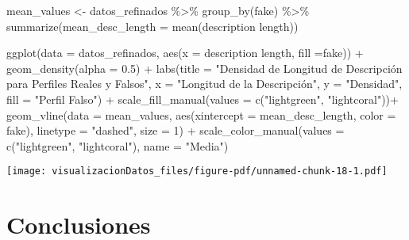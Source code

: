 \documentclass[
  letterpaper,
  DIV=11,
  numbers=noendperiod]{scrreprt}
\newenvironment{Shaded}{\begin{snugshade}}{\end{snugshade}}
\newcommand{\AttributeTok}[1]{\textcolor[rgb]{0.40,0.45,0.13}{#1}}
\newcommand{\DecValTok}[1]{\textcolor[rgb]{0.68,0.00,0.00}{#1}}
\newcommand{\FloatTok}[1]{\textcolor[rgb]{0.68,0.00,0.00}{#1}}
\newcommand{\FunctionTok}[1]{\textcolor[rgb]{0.28,0.35,0.67}{#1}}
\newcommand{\NormalTok}[1]{\textcolor[rgb]{0.00,0.23,0.31}{#1}}
\newcommand{\OtherTok}[1]{\textcolor[rgb]{0.00,0.23,0.31}{#1}}
\newcommand{\SpecialCharTok}[1]{\textcolor[rgb]{0.37,0.37,0.37}{#1}}
\newcommand{\StringTok}[1]{\textcolor[rgb]{0.13,0.47,0.30}{#1}}
\begin{document}
\begin{Shaded}
\begin{Highlighting}[]
\NormalTok{mean\_values }\OtherTok{\textless{}{-}}\NormalTok{ datos\_refinados }\SpecialCharTok{\%\textgreater{}\%} 
  \FunctionTok{group\_by}\NormalTok{(fake) }\SpecialCharTok{\%\textgreater{}\%} 
  \FunctionTok{summarize}\NormalTok{(}\AttributeTok{mean\_desc\_length =} \FunctionTok{mean}\NormalTok{(}\StringTok{\textasciigrave{}}\AttributeTok{description length}\StringTok{\textasciigrave{}}\NormalTok{))}

\FunctionTok{ggplot}\NormalTok{(}\AttributeTok{data =}\NormalTok{ datos\_refinados, }\FunctionTok{aes}\NormalTok{(}\AttributeTok{x =} \StringTok{\textasciigrave{}}\AttributeTok{description length}\StringTok{\textasciigrave{}}\NormalTok{, }\AttributeTok{fill =}\NormalTok{fake)) }\SpecialCharTok{+}
  \FunctionTok{geom\_density}\NormalTok{(}\AttributeTok{alpha =} \FloatTok{0.5}\NormalTok{) }\SpecialCharTok{+}
  \FunctionTok{labs}\NormalTok{(}\AttributeTok{title =} \StringTok{"Densidad de Longitud de Descripción para Perfiles Reales y Falsos"}\NormalTok{,}
       \AttributeTok{x =} \StringTok{"Longitud de la Descripción"}\NormalTok{,}
       \AttributeTok{y =} \StringTok{"Densidad"}\NormalTok{,}
       \AttributeTok{fill =} \StringTok{"Perfil Falso"}\NormalTok{) }\SpecialCharTok{+}
  \FunctionTok{scale\_fill\_manual}\NormalTok{(}\AttributeTok{values =} \FunctionTok{c}\NormalTok{(}\StringTok{"lightgreen"}\NormalTok{, }\StringTok{"lightcoral"}\NormalTok{))}\SpecialCharTok{+}
  \FunctionTok{geom\_vline}\NormalTok{(}\AttributeTok{data =}\NormalTok{ mean\_values, }\FunctionTok{aes}\NormalTok{(}\AttributeTok{xintercept =}\NormalTok{ mean\_desc\_length, }\AttributeTok{color =}\NormalTok{ fake), }\AttributeTok{linetype =} \StringTok{"dashed"}\NormalTok{, }\AttributeTok{size =} \DecValTok{1}\NormalTok{) }\SpecialCharTok{+}
  \FunctionTok{scale\_color\_manual}\NormalTok{(}\AttributeTok{values =} \FunctionTok{c}\NormalTok{(}\StringTok{"lightgreen"}\NormalTok{, }\StringTok{"lightcoral"}\NormalTok{), }\AttributeTok{name =} \StringTok{"Media"}\NormalTok{)}
\end{Highlighting}
\end{Shaded}

\texttt{[image: visualizacionDatos\_files/figure-pdf/unnamed-chunk-18-1.pdf]}

\section{Conclusiones}\label{conclusiones}
\end{document}
